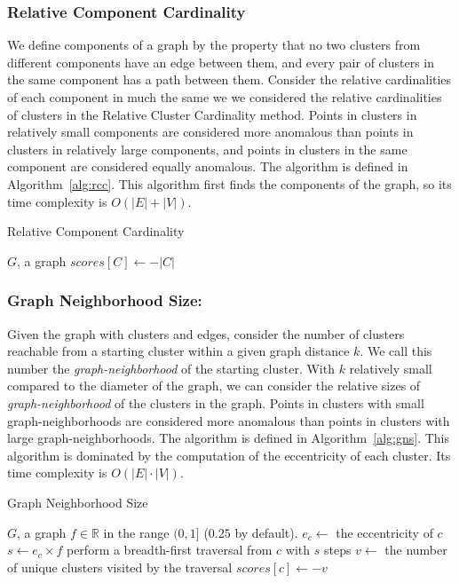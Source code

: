 \subsubsection{Relative Component Cardinality}
We define components of a graph by the property that no two clusters from different components have an edge between them, and every pair of clusters in the same component has a path between them.
Consider the relative cardinalities of each component in much the same we we considered the relative cardinalities of clusters in the Relative Cluster Cardinality method.
Points in clusters in relatively small components are considered more anomalous than points in clusters in relatively large components, and points in clusters in the same component are considered equally anomalous. The algorithm is defined in Algorithm~\ref{alg:rcc}. This algorithm first finds the components of the graph, so its time complexity is $O(|E| + |V|)$.

\begin{algorithm}[h]
    \caption{Relative Component Cardinality}
    \label{alg:rcc}
\begin{algorithmic}[1]
    \REQUIRE $G$, a graph
        \STATE $scores[C] \gets -|C|$
    \ENDFOR
\end{algorithmic}
\end{algorithm}

\subsubsection{Graph Neighborhood Size:}
Given the graph with clusters and edges, consider the number of clusters reachable from a starting cluster within a given graph distance $k$.
We call this number the \textit{graph-neighborhood} of the starting cluster.
With $k$ relatively small compared to the diameter of the graph, we can consider the relative sizes of \textit{graph-neighborhood} of the clusters in the graph.
Points in clusters with small graph-neighborhoods are considered more anomalous than points in clusters with large graph-neighborhoods. The algorithm is defined in Algorithm~\ref{alg:gns}.
This algorithm is dominated by the computation of the eccentricity of each cluster.
Its time complexity is $O(|E| \cdot |V|)$.


\begin{algorithm}[h]
    \caption{Graph Neighborhood Size}
    \label{alg:gns}
\begin{algorithmic}[1]
    \REQUIRE $G$, a graph
    \REQUIRE $f \in \mathbb{R}$ in the range $(0,1]$ ($0.25$ by default).
        \STATE $e_c \gets$ the eccentricity of $c$
        \STATE $s \gets e_c \times f$
        \STATE perform a breadth-first traversal from $c$ with $s$ steps
        \STATE $v \gets$ the number of unique clusters visited by the traversal
        \STATE $scores[c] \gets -v$
    \ENDFOR
\end{algorithmic}
\end{algorithm}



